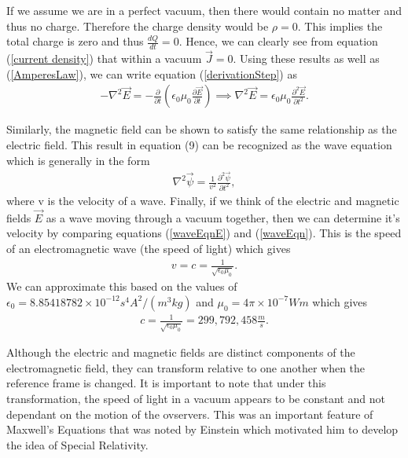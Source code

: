 If we assume we are in a perfect vacuum, then there would contain no matter and thus no charge. Therefore the charge density would be $\rho=0$. This implies the total charge is zero and thus $\frac{dQ}{dt}=0$. Hence, we can clearly see from equation (\ref{current density}) that within a vacuum $\vec{J}=0$. Using these results as well as (\ref{AmperesLaw}), we can write equation (\ref{derivationStep}) as
\begin{align}
	-\nabla^2\vec{E} = -\frac{\partial}{\partial t}\left(\epsilon_0\mu_0\frac{\partial \vec{E}}{\partial t}\right) \implies \nabla^2\vec{E} = \epsilon_0\mu_0\frac{\partial^2 \vec{E}}{\partial t^2}. \label{waveEqnE}
\end{align}

Similarly, the magnetic field can be shown to satisfy the same relationship as the electric field. This result in equation (9) can be recognized as the wave equation which is generally in the form
\begin{align}
	\nabla^2\vec{\psi} = \frac{1}{v^2}\frac{\partial^2 \vec{\psi}}{\partial t^2},\label{waveEqn}
\end{align}
where v is the velocity of a wave. Finally, if we think of the electric and magnetic fields $\vec{E}$ as a wave moving through a vacuum together, then we can determine it's velocity by comparing equations (\ref{waveEqnE}) and (\ref{waveEqn}). This is the speed of an electromagnetic wave (the speed of light) which gives
\begin{align}
	v=c=\frac{1}{\sqrt{\epsilon_0\mu_0}}.
\end{align}
We can approximate this based on the values of $\epsilon_0 = 8.85418782 \times 10^{-12}  s^4 A^2/(m^3 kg)$ and $\mu_0 =4\pi \times 10^{-7} Wm$ which gives
\begin{align}
	c=\frac{1}{\sqrt{\epsilon_0\mu_0}} = \boxed{299,792,458 \frac{m}{s}}.
\end{align}

\begin{interestnote}
Although the electric and magnetic fields are distinct components of the electromagnetic field, they can transform relative to one another when the reference frame is changed. It is important to note that under this transformation, the speed of light in a vacuum appears to be constant and not dependant on the motion of the ovservers. This was an important feature of Maxwell's Equations that was noted by Einstein which motivated him to develop the idea of Special Relativity.
\end{interestnote}
